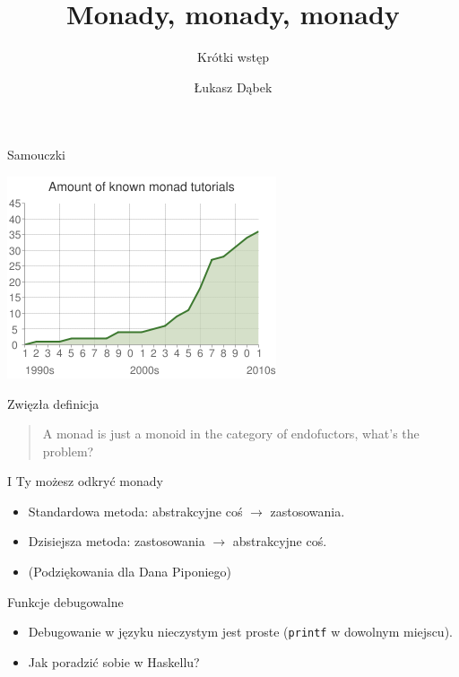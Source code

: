 \documentclass[14pt]{beamer}
\title[Monady]{Monady, monady, monady}
\subtitle{Krótki wstęp}
\author{Łukasz Dąbek}
\begin{document}
\begin{frame}[plain]
    \titlepage
\end{frame}

\begin{frame}{Samouczki}
    \begin{center}
        \includegraphics[scale=0.5]{monads-timeline.png}
    \end{center}
\end{frame}

\begin{frame}{Zwięzła definicja}
    \begin{quote}
        A monad is just a monoid in the category of endofuctors,
        what's the problem?
        \vskip5mm
        \hspace*{} 
    \end{quote}
\end{frame}


\begin{frame}{I Ty możesz odkryć monady}
    \begin{itemize}
        \item Standardowa metoda: abstrakcyjne coś $\rightarrow$ zastosowania.
        \pause
        \item Dzisiejsza metoda: zastosowania $\rightarrow$ abstrakcyjne coś.
        \item (Podziękowania dla Dana Piponiego)
    \end{itemize}
\end{frame}

\begin{frame}{Funkcje debugowalne}
    \begin{itemize}
        \item Debugowanie w języku nieczystym jest proste
            (\texttt{printf} w dowolnym miejscu).
        \pause
        \item Jak poradzić sobie w Haskellu?
    \end{itemize}
\end{frame}
\end{document}
